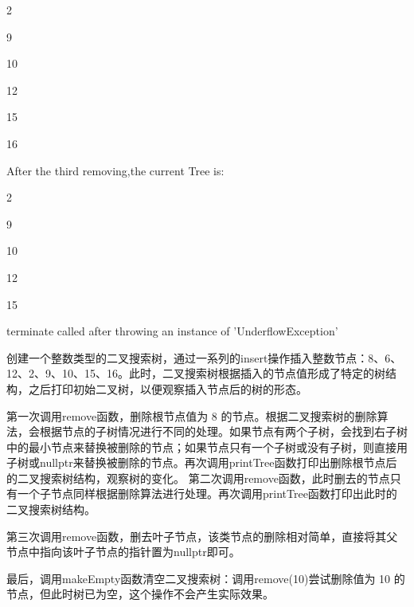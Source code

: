 \documentclass[UTF8]{ctexart}
\begin{document}
2

9

10

12

15

16

After the third removing,the current Tree is:

2

9

10

12

15

terminate called after throwing an instance of 'UnderflowException'

创建一个整数类型的二叉搜索树，通过一系列的insert操作插入整数节点：8、6、12、2、9、10、15、16。此时，二叉搜索树根据插入的节点值形成了特定的树结构，之后打印初始二叉树，以便观察插入节点后的树的形态。

第一次调用remove函数，删除根节点值为 8 的节点。根据二叉搜索树的删除算法，会根据节点的子树情况进行不同的处理。如果节点有两个子树，会找到右子树中的最小节点来替换被删除的节点；如果节点只有一个子树或没有子树，则直接用子树或nullptr来替换被删除的节点。再次调用printTree函数打印出删除根节点后的二叉搜索树结构，观察树的变化。
第二次调用remove函数，此时删去的节点只有一个子节点同样根据删除算法进行处理。再次调用printTree函数打印出此时的二叉搜索树结构。

第三次调用remove函数，删去叶子节点，该类节点的删除相对简单，直接将其父节点中指向该叶子节点的指针置为nullptr即可。

最后，调用makeEmpty函数清空二叉搜索树：调用remove(10)尝试删除值为 10 的节点，但此时树已为空，这个操作不会产生实际效果。
\end{document}

